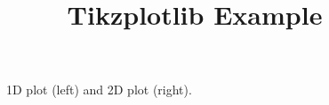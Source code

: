 \documentclass[a4paper,11pt]{article}
\title{\vspace{-10mm}Tikzplotlib Example}
\begin{document}
\maketitle

\begin{figure}[h]
\begin{minipage}[b]{0.49\textwidth}
    
    \vspace{-1cm}
\end{minipage}
\hfill
\begin{minipage}[b]{0.49\textwidth}
    
    \vspace{-1cm}
\end{minipage}
\caption{1D plot (left) and 2D plot (right).}
\label{fig:example_plots}
\end{figure}
\end{document}
